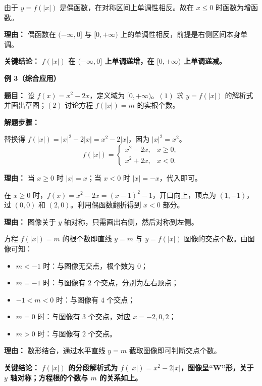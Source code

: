 \begin{examplebox}
\begin{description}[style=nextline, leftmargin=2.8em, labelsep=0.5em, itemsep=0.45em]
		\item[\textbf{第三步（利用偶函数对称性）：}]
			由于 $y=f(|x|)$ 是偶函数，在对称区间上单调性相反。故在 $x\le0$ 时函数为增函数。
			\par\textbf{理由：} 偶函数在 $(-\infty,0]$ 与 $[0,+\infty)$ 上的单调性相反，前提是右侧区间本身单调。
	\end{description}

	\textbf{\textcolor{CExample}{关键结论：}}
	\textbf{$f(|x|)$ 在 $(-\infty,0]$ 上单调递增，在 $[0,+\infty)$ 上单调递减。}

	\medskip
	\textbf{\textcolor{CExample}{例 3（综合应用）}}

	\textbf{\textcolor{CExample}{题目：}}
	设 $f(x)=x^2-2x$，定义域为 $[0,+\infty)$。$(1)$ 求 $y=f(|x|)$ 的解析式并画出草图；$(2)$ 讨论方程 $f(|x|)=m$ 的实根个数。

	\textbf{\textcolor{CExample}{解题步骤：}}
	\begin{description}[style=nextline, leftmargin=2.8em, labelsep=0.5em, itemsep=0.45em]
		\item[\textbf{第一步（求 $f(|x|)$ 解析式）：}]
			替换得 $f(|x|)=|x|^2-2|x|=x^2-2|x|$，因为 $|x|^2=x^2$。
			\[
				f(|x|)=
				\begin{cases}
					x^2-2x, & x\ge0,\\[2pt]
					x^2+2x, & x<0.
				\end{cases}
			\]
			\par\textbf{理由：} 当 $x\ge0$ 时 $|x|=x$；当 $x<0$ 时 $|x|=-x$，代入即可。

		\item[\textbf{第二步（绘制草图）：}]
			在 $x\ge0$ 时，$f(x)=x^2-2x=(x-1)^2-1$，开口向上，顶点为 $(1,-1)$，过 $(0,0)$ 和 $(2,0)$。利用偶函数翻折得到 $x<0$ 部分。
			\par\textbf{理由：} 图像关于 $y$ 轴对称，只需画出右侧，然后对称到左侧。

		\item[\textbf{第三步（根个数讨论）：}]
			方程 $f(|x|)=m$ 的根个数即直线 $y=m$ 与 $y=f(|x|)$ 图像的交点个数。由图像可知：
			\begin{itemize}[leftmargin=*]
				\item $m<-1$ 时：与图像无交点，根个数为 $0$；
				\item $m=-1$ 时：与图像有 $2$ 个交点，分别为左右顶点；
				\item $-1<m<0$ 时：与图像有 $4$ 个交点；
				\item $m=0$ 时：与图像有 $3$ 个交点，对应 $x=-2,0,2$；
				\item $m>0$ 时：与图像有 $2$ 个交点。
			\end{itemize}
			\par\textbf{理由：} 数形结合，通过水平直线 $y=m$ 截取图像即可判断交点个数。
	\end{description}

	\textbf{\textcolor{CExample}{关键结论：}}
	\textbf{$f(|x|)$ 的分段解析式为 $f(|x|)=x^2-2|x|$，图像呈“W”形，关于 $y$ 轴对称；方程根的个数与 $m$ 的关系如上。}
\end{examplebox}
